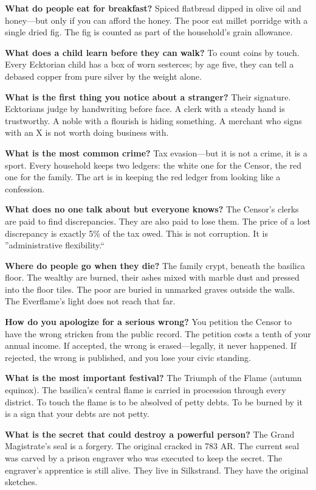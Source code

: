 \begin{almanac}
\textbf{What do people eat for breakfast?} Spiced flatbread dipped in olive oil and honey---but only if you can afford the honey. The poor eat millet porridge with a single dried fig. The fig is counted as part of the household's grain allowance.

\textbf{What does a child learn before they can walk?} To count coins by touch. Every Ecktorian child has a box of worn sesterces; by age five, they can tell a debased copper from pure silver by the weight alone.

\textbf{What is the first thing you notice about a stranger?} Their signature. Ecktorians judge by handwriting before face. A clerk with a steady hand is trustworthy. A noble with a flourish is hiding something. A merchant who signs with an X is not worth doing business with.

\textbf{What is the most common crime?} Tax evasion---but it is not a crime, it is a sport. Every household keeps two ledgers: the white one for the Censor, the red one for the family. The art is in keeping the red ledger from looking like a confession.

\textbf{What does no one talk about but everyone knows?} The Censor's clerks are paid to find discrepancies. They are also paid to lose them. The price of a lost discrepancy is exactly 5\% of the tax owed. This is not corruption. It is ''administrative flexibility.``

\textbf{Where do people go when they die?} The family crypt, beneath the basilica floor. The wealthy are burned, their ashes mixed with marble dust and pressed into the floor tiles. The poor are buried in unmarked graves outside the walls. The Everflame's light does not reach that far.

\textbf{How do you apologize for a serious wrong?} You petition the Censor to have the wrong stricken from the public record. The petition costs a tenth of your annual income. If accepted, the wrong is erased---legally, it never happened. If rejected, the wrong is published, and you lose your civic standing.

\textbf{What is the most important festival?} The Triumph of the Flame (autumn equinox). The basilica's central flame is carried in procession through every district. To touch the flame is to be absolved of petty debts. To be burned by it is a sign that your debts are not petty.

\textbf{What is the secret that could destroy a powerful person?} The Grand Magistrate's seal is a forgery. The original cracked in 783 AR. The current seal was carved by a prison engraver who was executed to keep the secret. The engraver's apprentice is still alive. They live in Silkstrand. They have the original sketches.
\end{almanac}

